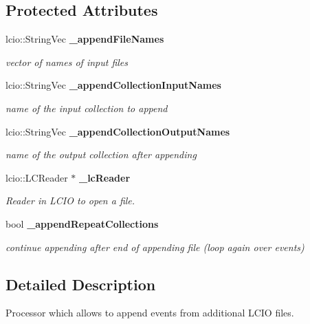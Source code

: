 \subsection*{Protected Attributes}
\begin{DoxyCompactItemize}
\item 
lcio\-::\-String\-Vec {\bf \-\_\-append\-File\-Names}\label{classCALICE_1_1Ahc2AppendProcessor_a20d46a95a43820da5b94ef213d78740c}

\begin{DoxyCompactList}\small\item\em vector of names of input files \end{DoxyCompactList}\item 
lcio\-::\-String\-Vec {\bf \-\_\-append\-Collection\-Input\-Names}\label{classCALICE_1_1Ahc2AppendProcessor_a630978ff6d3a72e76b38cda94d5ac7b2}

\begin{DoxyCompactList}\small\item\em name of the input collection to append \end{DoxyCompactList}\item 
lcio\-::\-String\-Vec {\bf \-\_\-append\-Collection\-Output\-Names}\label{classCALICE_1_1Ahc2AppendProcessor_acaef8b9543548dd47d24dff92b39d517}

\begin{DoxyCompactList}\small\item\em name of the output collection after appending \end{DoxyCompactList}\item 
lcio\-::\-L\-C\-Reader $\ast$ {\bf \-\_\-lc\-Reader}\label{classCALICE_1_1Ahc2AppendProcessor_a5339bbd6d833f8ba7d24ce45304965b0}

\begin{DoxyCompactList}\small\item\em Reader in L\-C\-I\-O to open a file. \end{DoxyCompactList}\item 
bool {\bf \-\_\-append\-Repeat\-Collections}\label{classCALICE_1_1Ahc2AppendProcessor_af4ac88f656de0d4b35f96c360e3d4a25}

\begin{DoxyCompactList}\small\item\em continue appending after end of appending file (loop again over events) \end{DoxyCompactList}\end{DoxyCompactItemize}


\subsection{Detailed Description}
Processor which allows to append events from additional L\-C\-I\-O files. 

